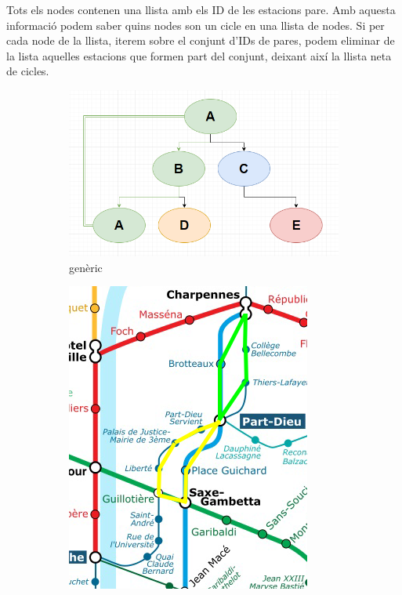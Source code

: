 \documentclass[a4paper,12pt,hidelinks]{article}
\begin{document}
            Tots els nodes contenen una llista amb els ID de les estacions pare. Amb aquesta informació podem saber quins nodes son un cicle en una llista de nodes. Si per cada node de la llista, iterem sobre el conjunt d’IDs de pares, podem eliminar de la lista aquelles estacions que formen part del conjunt, deixant així la llista neta de cicles.
            \begin{figure}[h]
                \centering
                \begin{subfigure}[b]{0.3\textwidth}
                    \includegraphics[width=\textwidth]{ciclo.png}
                    \caption{genèric}
                \end{subfigure}
                \hfil
                \begin{subfigure}[b]{0.3\textwidth}
                    \includegraphics[width=\textwidth]{cicloLyon.png}

\end{subfigure}
\end{figure}
\end{document}
